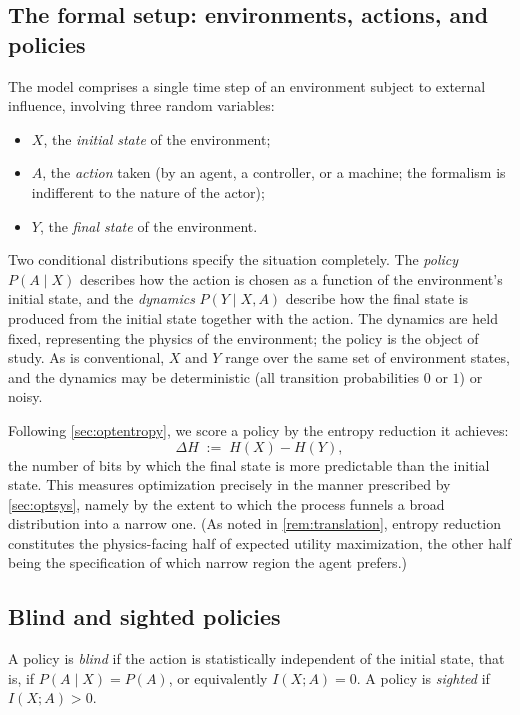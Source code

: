 \documentclass[11pt]{article}
\begin{document}
\subsection{The formal setup: environments, actions, and policies}
\label{sec:tlsetup}

The model comprises a single time step of an environment subject to external influence, involving three random variables:

\begin{itemize}[leftmargin=2em]
  \item $X$, the \emph{initial state} of the environment;
  \item $A$, the \emph{action} taken (by an agent, a controller, or a machine; the formalism is indifferent to the nature of the actor);
  \item $Y$, the \emph{final state} of the environment.
\end{itemize}

Two conditional distributions specify the situation completely. The \emph{policy} $P(A \mid X)$ describes how the action is chosen as a function of the environment's initial state, and the \emph{dynamics} $P(Y \mid X, A)$ describe how the final state is produced from the initial state together with the action. The dynamics are held fixed, representing the physics of the environment; the policy is the object of study. As is conventional, $X$ and $Y$ range over the same set of environment states, and the dynamics may be deterministic (all transition probabilities $0$ or $1$) or noisy.

Following \cref{sec:optentropy}, we score a policy by the entropy reduction it achieves:
\[
\Delta H \;:=\; H(X) - H(Y),
\]
the number of bits by which the final state is more predictable than the initial state. This measures optimization precisely in the manner prescribed by \cref{sec:optsys}, namely by the extent to which the process funnels a broad distribution into a narrow one. (As noted in \cref{rem:translation}, entropy reduction constitutes the physics-facing half of expected utility maximization, the other half being the specification of which narrow region the agent prefers.)

\subsection{Blind and sighted policies}
\label{sec:blindsighted}

\begin{definition}
\label{def:blind}
A policy is \emph{blind} if the action is statistically independent of the initial state, that is, if $P(A \mid X) = P(A)$, or equivalently $I(X; A) = 0$. A policy is \emph{sighted} if $I(X; A) > 0$.
\end{definition}
\end{document}
